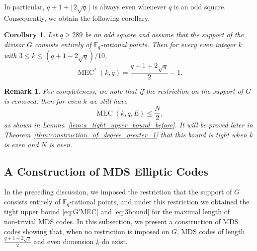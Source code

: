 \documentclass[journal,12pt,onecolumn]{IEEEtran}
\newtheorem{corollary}[theorem]{Corollary}
\newtheorem{remark}[theorem]{Remark}
\begin{document}
In particular, $q+1+ \lfloor 2\sqrt{q} \rfloor$ is always even whenever $q$ is an odd square. Consequently, we obtain the following corollary.

\begin{corollary}\label{cor:MEC-1}
Let $q \ge 289$ be an odd square and assume that the support of the divisor $G$ consists entirely of $\mathbb{F}_q$-rational points. Then for every even integer $k$ with $3 \le k \le (q + 1 - 2\sqrt{q})/10$,
\begin{equation}\label{eq:3bound}
    \operatorname{MEC}^*(k,q) = \frac{q+1+2\sqrt{q}}{2} - 1.
\end{equation}

\end{corollary}

\begin{remark}\label{remark:suppG_contain_gt1}
For completeness, we note that if the restriction on the support of $G$ is removed, then for even $k$ we still have
\[
\operatorname{MEC}(k, q, E) \le \frac{N}{2},
\]
as shown in Lemma~\ref{lem:a_tight_upper_bound_before}. It will be proved later in Theorem~\ref{thm:construction_of_degree_greater_1} that this bound is tight when $k$ is even and $N$ is even.
\end{remark}



\subsection{A Construction of MDS Elliptic Codes}
In the preceding discussion, we imposed the restriction that the support of $G$ consists entirely of $\mathbb{F}_q$-rational points, and under this restriction we obtained the tight upper bound \eqref{eq:G'MEC} and \eqref{eq:3bound} for the maximal length of non‑trivial MDS codes. In this subsection, we present a construction of MDS codes showing that, when no restriction is imposed on $G$, MDS codes of length $\frac{q+1+2\sqrt{q}}{2}$ and even dimension $k$ do exist.
\end{document}
